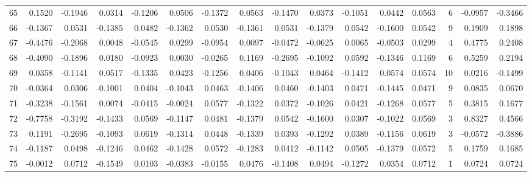 \begin{tabular}{lrrrrrrrrrrrrrrr}
65  &      0.1520 & -0.1946 &  0.0314 & -0.1206 &  0.0506 & -0.1372 &  0.0563 & -0.1470 &  0.0373 & -0.1051 &   0.0442 &     0.0563 &      6 &                   -0.0957 &                    -0.3466 \\
66  &     -0.1367 &  0.0531 & -0.1385 &  0.0482 & -0.1362 &  0.0530 & -0.1361 &  0.0531 & -0.1379 &  0.0542 &  -0.1600 &     0.0542 &      9 &                    0.1909 &                     0.1898 \\
67  &     -0.4476 & -0.2068 &  0.0048 & -0.0545 &  0.0299 & -0.0954 &  0.0097 & -0.0472 & -0.0625 &  0.0065 &  -0.0503 &     0.0299 &      4 &                    0.4775 &                     0.2408 \\
68  &     -0.4090 & -0.1896 &  0.0180 & -0.0923 &  0.0030 & -0.0265 &  0.1169 & -0.2695 & -0.1092 &  0.0592 &  -0.1346 &     0.1169 &      6 &                    0.5259 &                     0.2194 \\
69  &      0.0358 & -0.1141 &  0.0517 & -0.1335 &  0.0423 & -0.1256 &  0.0406 & -0.1043 &  0.0464 & -0.1412 &   0.0574 &     0.0574 &     10 &                    0.0216 &                    -0.1499 \\
70  &     -0.0364 &  0.0306 & -0.1001 &  0.0404 & -0.1043 &  0.0463 & -0.1406 &  0.0460 & -0.1403 &  0.0471 &  -0.1445 &     0.0471 &      9 &                    0.0835 &                     0.0670 \\
71  &     -0.3238 & -0.1561 &  0.0074 & -0.0415 & -0.0024 &  0.0577 & -0.1322 &  0.0372 & -0.1026 &  0.0421 &  -0.1268 &     0.0577 &      5 &                    0.3815 &                     0.1677 \\
72  &     -0.7758 & -0.3192 & -0.1433 &  0.0569 & -0.1147 &  0.0481 & -0.1379 &  0.0542 & -0.1600 &  0.0307 &  -0.1022 &     0.0569 &      3 &                    0.8327 &                     0.4566 \\
73  &      0.1191 & -0.2695 & -0.1093 &  0.0619 & -0.1314 &  0.0448 & -0.1339 &  0.0393 & -0.1292 &  0.0389 &  -0.1156 &     0.0619 &      3 &                   -0.0572 &                    -0.3886 \\
74  &     -0.1187 &  0.0498 & -0.1246 &  0.0462 & -0.1428 &  0.0572 & -0.1283 &  0.0412 & -0.1142 &  0.0505 &  -0.1379 &     0.0572 &      5 &                    0.1759 &                     0.1685 \\
75  &     -0.0012 &  0.0712 & -0.1549 &  0.0103 & -0.0383 & -0.0155 &  0.0476 & -0.1408 &  0.0494 & -0.1272 &   0.0354 &     0.0712 &      1 &                    0.0724 &                     0.0724 \\

\end{tabular}
